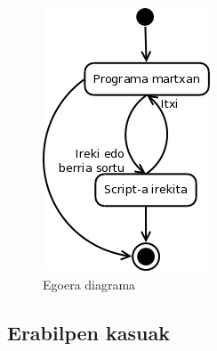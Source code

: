 \begin{figure}[htp]
\begin{center}
\includegraphics[scale=0.4]{Pictures/Chapter4/Analisia/ED.png}
\caption{Egoera diagrama}
\label{ed}
\end{center}
\end{figure}
\newpage
\subsection{Erabilpen kasuak}

